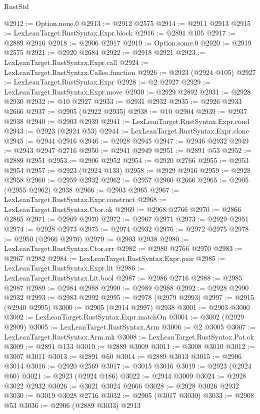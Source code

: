 \begin{lexlean}{RustStd}
\begin{coremodule}
{\begin{coremodule}
{{{{{{{{{{{{{{{{{{{{{{{{{{{{{{{{{{{{{{{{{{{{{{{{{{{{{{{{{{{{{{{{{{{{{{{{{{{{{{@2912 := Option.none.{0}
@2913 := @2912 @2575
@2914 := @2911 @2913
@2915 := LexLeanTarget.RustSyntax.Expr.block
@2916 := @2891 @105
@2917 := @2889 @2916
@2918 := @2906 @2917
@2919 := Option.some.{0}
@2920 := @2919 @2575
@2921 := @2920 @2684
@2922 := @2918 @2921
@2923 := LexLeanTarget.RustSyntax.Expr.call
@2924 := LexLeanTarget.RustSyntax.Callee.function
@2926 := @2923 (@2924 @105)
@2927 := LexLeanTarget.RustSyntax.Expr
@2928 := @2 @2927
@2929 := LexLeanTarget.RustSyntax.Expr.move
@2930 := @2929 @2892
@2931 := @2928 @2930
@2932 := @10 @2927
@2933 := @2931 @2932
@2935 := @2926 @2933 @2666
@2937 := @2905 (@2922 @2935)
@2938 := @10 @2904
@2939 := @2937 @2938
@2940 := @2903 @2939
@2941 := LexLeanTarget.RustSyntax.Expr.cond
@2943 := @2923 (@2924 @53)
@2944 := LexLeanTarget.RustSyntax.Expr.clone
@2945 := @2944 @2916
@2946 := @2928 @2945
@2947 := @2946 @2932
@2949 := @2943 @2947 @2716
@2950 := @2941 @2949
@2951 := @2891 @53
@2952 := @2889 @2951
@2953 := @2906 @2952
@2954 := @2920 @2766
@2955 := @2953 @2954
@2957 := @2923 (@2924 @133)
@2958 := @2929 @2916
@2959 := @2928 @2958
@2960 := @2959 @2932
@2962 := @2957 @2960 @2666
@2965 := @2905 (@2955 @2962) @2938
@2966 := @2903 @2965
@2967 := LexLeanTarget.RustSyntax.Expr.construct
@2968 := LexLeanTarget.RustSyntax.Ctor.ok
@2969 := @2968 @2766
@2970 := @2866 @2865
@2971 := @2969 @2970
@2972 := @2967 @2971
@2973 := @2929 @2951
@2974 := @2928 @2973
@2975 := @2974 @2932
@2976 := @2972 @2975
@2978 := @2950 (@2966 @2976)
@2979 := @2903 @2938
@2980 := LexLeanTarget.RustSyntax.Ctor.err
@2982 := @2980 @2766 @2970
@2983 := @2967 @2982
@2984 := LexLeanTarget.RustSyntax.Expr.pair
@2985 := LexLeanTarget.RustSyntax.Expr.lit
@2986 := LexLeanTarget.RustSyntax.Lit.bool
@2987 := @2986 @2716
@2988 := @2985 @2987
@2989 := @2984 @2988
@2990 := @2989 @2988
@2992 := @2928 @2990 @2932
@2993 := @2983 @2992
@2995 := @2978 (@2979 @2993)
@2997 := @2915 (@2940 @2995)
@3000 := @2905 (@2914 @2997) @2938
@3001 := @2903 @3000
@3002 := LexLeanTarget.RustSyntax.Expr.matchOn
@3004 := @3002 (@2929 @2909)
@3005 := LexLeanTarget.RustSyntax.Arm
@3006 := @2 @3005
@3007 := LexLeanTarget.RustSyntax.Arm.mk
@3008 := LexLeanTarget.RustSyntax.Pat.ok
@3009 := @2891 @133
@3010 := @2889 @3009
@3011 := @3008 @3010
@3012 := @3007 @3011
@3013 := @2891 @60
@3014 := @2889 @3013
@3015 := @2906 @3014
@3016 := @2920 @2569
@3017 := @3015 @3016
@3019 := @2923 (@2924 @60)
@3021 := @2923 (@2924 @186)
@3022 := @2944 @3009
@3024 := @2928 @3022 @2932
@3026 := @3021 @3024 @2666
@3028 := @2928 @3026 @2932
@3030 := @3019 @3028 @2716
@3032 := @2905 (@3017 @3030)
@3033 := @2908 @53
@3036 := @2906 (@2889 @3033) @2913
}}}}}}}}}}}}}}}}}}}}}}}}}}}}}}}}}}}}}}}}}}}}}}}}}}}}}}}}}}}}}}}}}}}}}}}}}}}}}}
\end{coremodule}}
\end{coremodule}
\end{lexlean}
